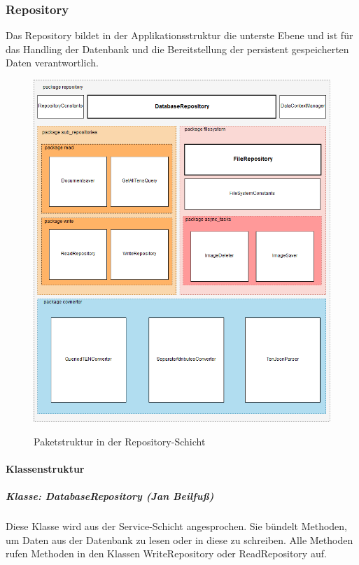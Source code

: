 \subsubsection{Repository}
Das Repository bildet in der Applikationsstruktur die unterste Ebene und ist für das Handling der Datenbank und die Bereitstellung der persistent gespeicherten Daten verantwortlich.

\begin{figure}[H]
\centering
\begin{minipage}[t]{1\textwidth} %
\caption{Paketstruktur in der Repository-Schicht} %
\includegraphics[width=1 \textwidth]{img/RepositoryPackages}\\ %
\end{minipage}
\end{figure}

\paragraph{Klassenstruktur}

\subparagraph{Klasse: DatabaseRepository (Jan Beilfuß)}
Diese Klasse wird aus der Service-Schicht angesprochen. Sie bündelt Methoden, um Daten aus der Datenbank zu lesen oder in diese zu schreiben. Alle Methoden rufen Methoden in den Klassen WriteRepository oder ReadRepository auf.

